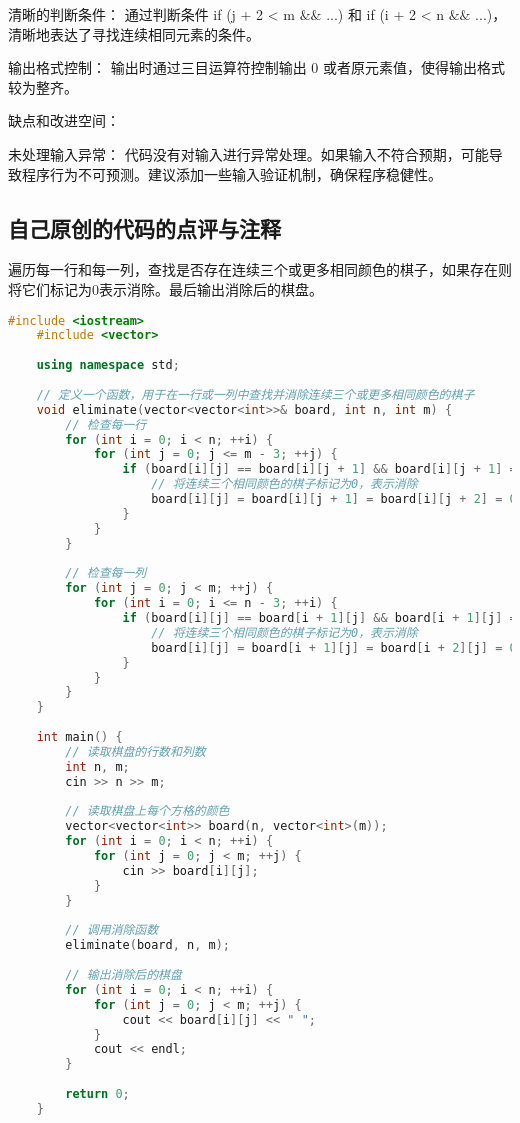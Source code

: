 清晰的判断条件： 通过判断条件 if (j + 2 < m $\&\&$ ...) 和 if (i + 2 < n $\&\&$ ...)，清晰地表达了寻找连续相同元素的条件。

输出格式控制： 输出时通过三目运算符控制输出 0 或者原元素值，使得输出格式较为整齐。

缺点和改进空间：

未处理输入异常： 代码没有对输入进行异常处理。如果输入不符合预期，可能导致程序行为不可预测。建议添加一些输入验证机制，确保程序稳健性。

\subsection{自己原创的代码的点评与注释}

遍历每一行和每一列，查找是否存在连续三个或更多相同颜色的棋子，如果存在则将它们标记为0表示消除。最后输出消除后的棋盘。

\begin{lstlisting}[language=C++]
    #include <iostream>
    #include <vector>
    
    using namespace std;
    
    // 定义一个函数，用于在一行或一列中查找并消除连续三个或更多相同颜色的棋子
    void eliminate(vector<vector<int>>& board, int n, int m) {
        // 检查每一行
        for (int i = 0; i < n; ++i) {
            for (int j = 0; j <= m - 3; ++j) {
                if (board[i][j] == board[i][j + 1] && board[i][j + 1] == board[i][j + 2]) {
                    // 将连续三个相同颜色的棋子标记为0，表示消除
                    board[i][j] = board[i][j + 1] = board[i][j + 2] = 0;
                }
            }
        }
    
        // 检查每一列
        for (int j = 0; j < m; ++j) {
            for (int i = 0; i <= n - 3; ++i) {
                if (board[i][j] == board[i + 1][j] && board[i + 1][j] == board[i + 2][j]) {
                    // 将连续三个相同颜色的棋子标记为0，表示消除
                    board[i][j] = board[i + 1][j] = board[i + 2][j] = 0;
                }
            }
        }
    }
    
    int main() {
        // 读取棋盘的行数和列数
        int n, m;
        cin >> n >> m;
    
        // 读取棋盘上每个方格的颜色
        vector<vector<int>> board(n, vector<int>(m));
        for (int i = 0; i < n; ++i) {
            for (int j = 0; j < m; ++j) {
                cin >> board[i][j];
            }
        }
    
        // 调用消除函数
        eliminate(board, n, m);
    
        // 输出消除后的棋盘
        for (int i = 0; i < n; ++i) {
            for (int j = 0; j < m; ++j) {
                cout << board[i][j] << " ";
            }
            cout << endl;
        }
    
        return 0;
    }    
\end{lstlisting}